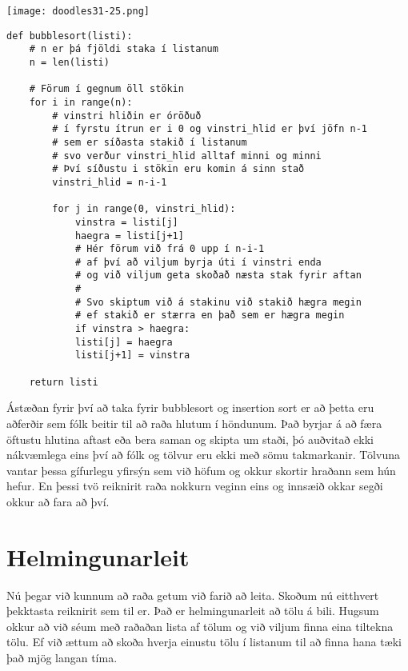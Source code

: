 \phantom{easter egg}
\begin{center}
	\texttt{[image: doodles31-25.png]}
\end{center}

\begin{lstlisting}[caption=Bubble sort reikniritið, label=lst:reiknirit-bubble]
	def bubblesort(listi):
	# n er þá fjöldi staka í listanum
	n = len(listi)
	
	# Förum í gegnum öll stökin
	for i in range(n):
		# vinstri hliðin er óröðuð 
		# í fyrstu ítrun er i 0 og vinstri_hlid er því jöfn n-1
		# sem er síðasta stakið í listanum
		# svo verður vinstri_hlid alltaf minni og minni
		# Því síðustu i stökin eru komin á sinn stað
		vinstri_hlid = n-i-1
		
		for j in range(0, vinstri_hlid):
			vinstra = listi[j]
			haegra = listi[j+1]
			# Hér förum við frá 0 upp í n-i-1
			# af því að viljum byrja úti í vinstri enda 
			# og við viljum geta skoðað næsta stak fyrir aftan
			# 
			# Svo skiptum við á stakinu við stakið hægra megin
			# ef stakið er stærra en það sem er hægra megin
			if vinstra > haegra:
			listi[j] = haegra
			listi[j+1] = vinstra
		
	return listi
\end{lstlisting}

Ástæðan fyrir því að taka fyrir bubblesort og insertion sort er að þetta eru aðferðir sem fólk beitir til að raða hlutum í höndunum.
Það byrjar á að færa öftustu hlutina aftast eða bera saman og skipta um staði, þó auðvitað ekki nákvæmlega eins því að fólk og tölvur eru ekki með sömu takmarkanir. 
Tölvuna vantar þessa gífurlegu yfirsýn sem við höfum og okkur skortir hraðann sem hún hefur.
En þessi tvö reiknirit raða nokkurn veginn eins og innsæið okkar segði okkur að fara að því.


\section{Helmingunarleit}\label{uk:reiknirit-helmingunarleit}
Nú þegar við kunnum að raða getum við farið að leita.
Skoðum nú eitthvert þekktasta reiknirit sem til er. 
Það er helmingunarleit að tölu á bili. 
Hugsum okkur að við séum með raðaðan lista af tölum og við viljum finna eina tiltekna tölu. 
Ef við ættum að skoða hverja einustu tölu í listanum til að finna hana tæki það mjög langan tíma.

